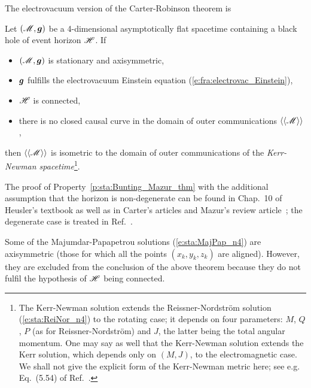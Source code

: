The electrovacuum version of the Carter-Robinson theorem is

\begin{prop}
\label{p:sta:Bunting_Mazur_thm}
Let $(\mathscr{M},\bm{g})$ be a 4-dimensional asymptotically flat spacetime
containing a black hole of event horizon $\mathscr{H}$. If
\begin{itemize}
\item $(\mathscr{M},\bm{g})$ is stationary and axisymmetric,
\item $\bm{g}$ fulfills the electrovacuum Einstein equation (\ref{e:fra:electrovac_Einstein}),
\item $\mathscr{H}$ is connected,
\item there is no closed causal curve in the domain of outer communications $\langle\langle \mathscr{M}\rangle\rangle$,
\end{itemize}
then $\langle\langle \mathscr{M}\rangle\rangle$ is isometric
to the domain of outer communications of the
\emph{Kerr-Newman spacetime}\footnote{The Kerr-Newman
solution extends the Reissner-Nordström solution (\ref{e:sta:ReiNor_n4}) to
the rotating case; it depends on four parameters: $M$, $Q$, $P$ (as for Reissner-Nordström)
and $J$, the latter being the total angular momentum.
One may say as well that the Kerr-Newman solution extends the Kerr solution,
which depends only on $(M,J)$, to the electromagnetic case.
We shall not give
the explicit form of the Kerr-Newman metric here; see e.g. Eq.~(5.54) of Ref.~\cite{Carte73a}.}.
\end{prop}
The proof of Property~\ref{p:sta:Bunting_Mazur_thm}
with the additional assumption that the horizon is non-degenerate
can be found in Chap.~10 of Heusler's textbook \cite{Heusl96}
as well as in Carter's articles \cite{Carte85,Carte87} and Mazur's review article~\cite{Mazur01}; the degenerate case is treated in
Ref.~\cite{ChrusN10}.

\begin{remark}
Some of the Majumdar-Papapetrou solutions
(\ref{e:sta:MajPap_n4})
are axisymmetric (those for which all the points $(x_k,y_k,z_k)$ are aligned).
However, they are excluded from the conclusion of the above theorem because they
do not fulfil the hypothesis of $\mathscr{H}$ being connected.
\end{remark}

